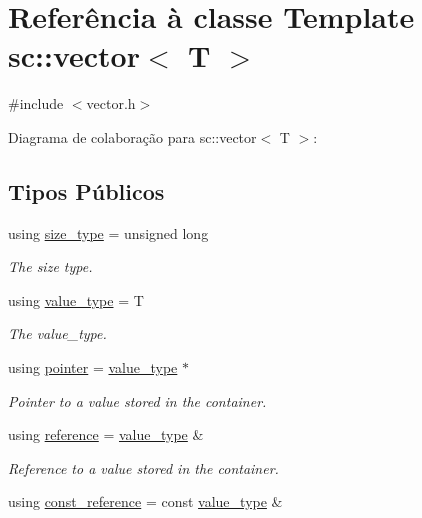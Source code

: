 \hypertarget{classsc_1_1vector}{}\section{Referência à classe Template sc\+:\+:vector$<$ T $>$}
\label{classsc_1_1vector}


{\ttfamily \#include $<$vector.\+h$>$}



Diagrama de colaboração para sc\+:\+:vector$<$ T $>$\+:
\subsection*{Tipos Públicos}
\begin{DoxyCompactItemize}
\item 
using \hyperlink{classsc_1_1vector_a48bf37ba1a6d0c13504414d86e27c399}{size\+\_\+type} = unsigned long
\begin{DoxyCompactList}\small\item\em The size type. \end{DoxyCompactList}\item 
using \hyperlink{classsc_1_1vector_ad37f5bfa688e43c420ed565e4bff6fac}{value\+\_\+type} = T
\begin{DoxyCompactList}\small\item\em The value\+\_\+type. \end{DoxyCompactList}\item 
using \hyperlink{classsc_1_1vector_a0348a6e1e249e051964a2bc94b05527a}{pointer} = \hyperlink{classsc_1_1vector_ad37f5bfa688e43c420ed565e4bff6fac}{value\+\_\+type} $\ast$
\begin{DoxyCompactList}\small\item\em Pointer to a value stored in the container. \end{DoxyCompactList}\item 
using \hyperlink{classsc_1_1vector_a37394c8a6b82c4a0709737d7982e32b2}{reference} = \hyperlink{classsc_1_1vector_ad37f5bfa688e43c420ed565e4bff6fac}{value\+\_\+type} \&
\begin{DoxyCompactList}\small\item\em Reference to a value stored in the container. \end{DoxyCompactList}\item 
using \hyperlink{classsc_1_1vector_a8da2b1a11b069241100f9b2e14f481a0}{const\+\_\+reference} = const \hyperlink{classsc_1_1vector_ad37f5bfa688e43c420ed565e4bff6fac}{value\+\_\+type} \&

\end{DoxyCompactItemize}

